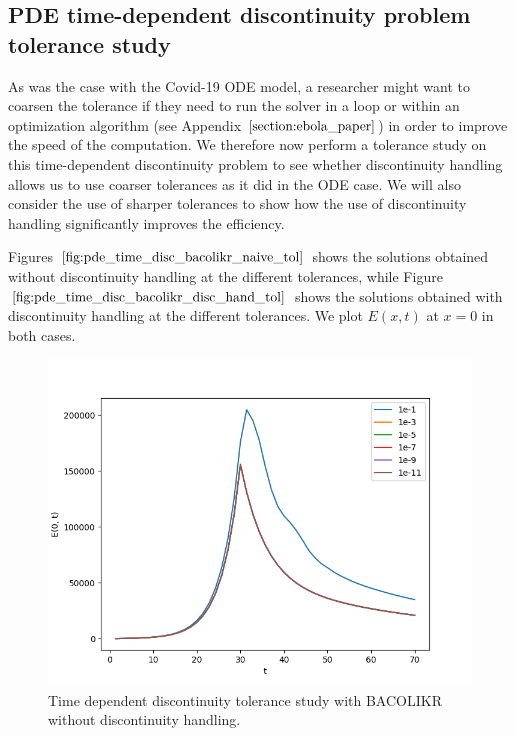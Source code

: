 \subsection{PDE time-dependent discontinuity problem tolerance study}
\label{subsubsection:pde_time_tol}

As was the case with the Covid-19 ODE model, a researcher might want to coarsen the tolerance if they need to run the solver in a loop or within an optimization algorithm (see Appendix $\ref{section:ebola_paper}$) in order to improve the speed of the computation. We therefore now perform a tolerance study on this time-dependent discontinuity problem to see whether discontinuity handling allows us to use coarser tolerances as it did in the ODE case. We will also consider the use of sharper tolerances to show how the use of discontinuity handling significantly improves the efficiency.

Figures $\ref{fig:pde_time_disc_bacolikr_naive_tol}$ shows the solutions obtained without discontinuity handling at the different tolerances, while Figure $\ref{fig:pde_time_disc_bacolikr_disc_hand_tol}$ shows the solutions obtained with discontinuity handling at the different tolerances. We plot $E(x, t)$ at $x=0$ in both cases. 

\begin{figure}[H]
\centering
\includegraphics[width=0.7\linewidth]{./figures/pde_time_disc_bacolikr_naive_tol}
\caption{Time dependent discontinuity tolerance study with BACOLIKR without discontinuity handling.}
\label{fig:pde_time_disc_bacolikr_naive_tol}
\end{figure}

